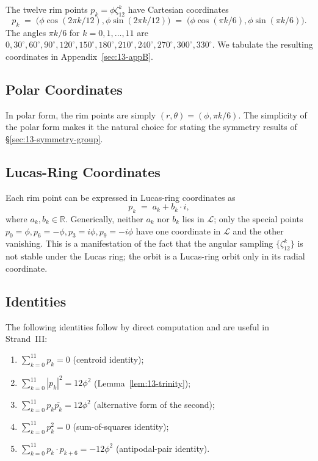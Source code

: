 The twelve rim points $p_{k} = \phi \zeta_{12}^{k}$ have Cartesian
coordinates
\[
  p_{k} \;=\; \bigl( \phi \cos(2\pi k / 12), \phi \sin(2\pi k / 12) \bigr)
       \;=\; \bigl( \phi \cos(\pi k / 6), \phi \sin(\pi k / 6) \bigr).
\]
The angles $\pi k / 6$ for $k = 0, 1, \ldots, 11$ are
$0, 30^{\circ}, 60^{\circ}, 90^{\circ}, 120^{\circ}, 150^{\circ},
180^{\circ}, 210^{\circ}, 240^{\circ}, 270^{\circ}, 300^{\circ},
330^{\circ}$. We tabulate the resulting coordinates in
Appendix~\ref{sec:13-appB}.

\subsection{Polar Coordinates}
\label{fa_13:sec:13-polar}

In polar form, the rim points are simply $(r, \theta) = (\phi,
\pi k / 6)$. The simplicity of the polar form makes it the natural
choice for stating the symmetry results of \S\ref{sec:13-symmetry-group}.

\subsection{Lucas-Ring Coordinates}
\label{fa_13:sec:13-lucas-ring-coords}

Each rim point can be expressed in Lucas-ring coordinates as
\[
  p_{k} \;=\; a_{k} + b_{k} \cdot i,
\]
where $a_{k}, b_{k} \in \mathbb{R}$. Generically, neither $a_{k}$
nor $b_{k}$ lies in $\mathcal{L}$; only the special points $p_{0} =
\phi, p_{6} = -\phi, p_{3} = i\phi, p_{9} = -i\phi$ have one
coordinate in $\mathcal{L}$ and the other vanishing. This is a
manifestation of the fact that the angular sampling
$\{\zeta_{12}^{k}\}$ is not stable under the Lucas ring; the orbit
is a Lucas-ring orbit only in its radial coordinate.

\subsection{Identities}
\label{fa_13:sec:13-identities}

The following identities follow by direct computation and are
useful in Strand~III:

\begin{enumerate}
\item $\sum_{k=0}^{11} p_{k} = 0$ (centroid identity);
\item $\sum_{k=0}^{11} |p_{k}|^{2} = 12 \phi^{2}$
  (Lemma~\ref{lem:13-trinity});
\item $\sum_{k=0}^{11} p_{k} \bar{p_{k}} = 12 \phi^{2}$ (alternative
  form of the second);
\item $\sum_{k=0}^{11} p_{k}^{2} = 0$ (sum-of-squares identity);
\item $\sum_{k=0}^{11} p_{k} \cdot p_{k+6} = -12 \phi^{2}$
  (antipodal-pair identity).
\end{enumerate}

